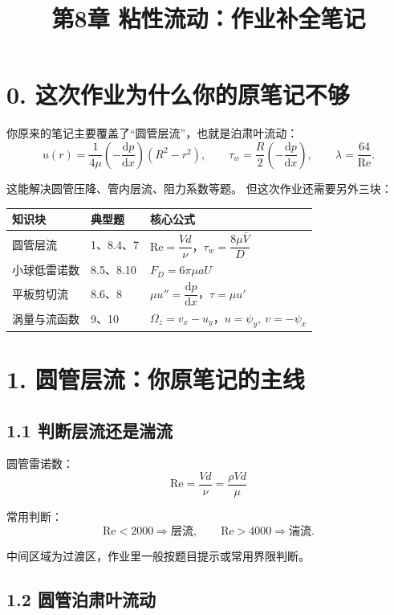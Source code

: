 \documentclass[12pt,a4paper]{ctexart}
\title{第8章 粘性流动：作业补全笔记}
\author{}
\date{}
\newcommand{\dd}{\mathrm d}
\newcommand{\Rey}{\mathrm{Re}}
\begin{document}
\maketitle

\section*{0. 这次作业为什么你的原笔记不够}

你原来的笔记主要覆盖了“圆管层流”，也就是泊肃叶流动：
\[
u(r)=\frac{1}{4\mu}\left(-\frac{\dd p}{\dd x}\right)(R^2-r^2),
\qquad
\tau_w=\frac{R}{2}\left(-\frac{\dd p}{\dd x}\right),
\qquad
\lambda=\frac{64}{\Rey}.
\]

这能解决圆管压降、管内层流、阻力系数等题。
但这次作业还需要另外三块：

\begin{center}
\begin{tabular}{lll}
\toprule
知识块 & 典型题 & 核心公式 \\
\midrule
圆管层流 & 1、8.4、7 & \(\Rey=\dfrac{Vd}{\nu}\)，\(\tau_w=\dfrac{8\mu \bar V}{D}\) \\
小球低雷诺数 & 8.5、8.10 & \(F_D=6\pi\mu aU\) \\
平板剪切流 & 8.6、8 & \(\mu u''=\dfrac{\dd p}{\dd x}\)，\(\tau=\mu u'\) \\
涡量与流函数 & 9、10 & \(\Omega_z=v_x-u_y\)，\(u=\psi_y,\ v=-\psi_x\) \\
\bottomrule
\end{tabular}
\end{center}

\section*{1. 圆管层流：你原笔记的主线}

\subsection*{1.1 判断层流还是湍流}

圆管雷诺数：
\[
\boxed{
\Rey=\frac{Vd}{\nu}=\frac{\rho Vd}{\mu}
}
\]

常用判断：
\[
\Rey<2000\Rightarrow \text{层流},
\qquad
\Rey>4000\Rightarrow \text{湍流}.
\]

中间区域为过渡区，作业里一般按题目提示或常用界限判断。

\subsection*{1.2 圆管泊肃叶流动}
\end{document}
